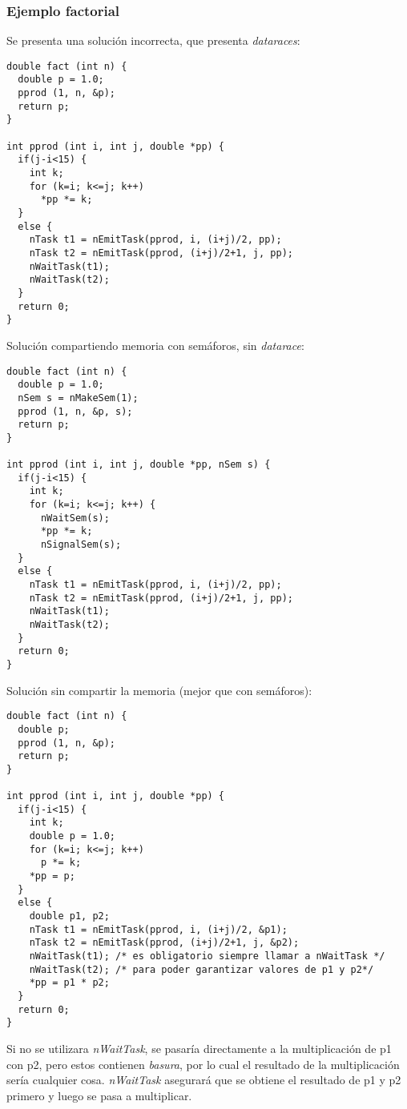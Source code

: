 \subsubsection{Ejemplo factorial}

Se presenta una solución incorrecta, que presenta \emph{dataraces}:

\begin{verbatim}
double fact (int n) {
  double p = 1.0;
  pprod (1, n, &p);
  return p;
}

int pprod (int i, int j, double *pp) {
  if(j-i<15) {
    int k;
    for (k=i; k<=j; k++)
      *pp *= k;
  }
  else {
    nTask t1 = nEmitTask(pprod, i, (i+j)/2, pp);
    nTask t2 = nEmitTask(pprod, (i+j)/2+1, j, pp);
    nWaitTask(t1);
    nWaitTask(t2);
  }
  return 0;
}
\end{verbatim}

Solución compartiendo memoria con semáforos, sin \emph{datarace}:

\begin{verbatim}
double fact (int n) {
  double p = 1.0;
  nSem s = nMakeSem(1);
  pprod (1, n, &p, s);
  return p;
}

int pprod (int i, int j, double *pp, nSem s) {
  if(j-i<15) {
    int k;
    for (k=i; k<=j; k++) {
      nWaitSem(s);
      *pp *= k;
      nSignalSem(s);
  }
  else {
    nTask t1 = nEmitTask(pprod, i, (i+j)/2, pp);
    nTask t2 = nEmitTask(pprod, (i+j)/2+1, j, pp);
    nWaitTask(t1);
    nWaitTask(t2);
  }
  return 0;
}
\end{verbatim}

Solución sin compartir la memoria (mejor que con semáforos):

\begin{verbatim}
double fact (int n) {
  double p;
  pprod (1, n, &p);
  return p;
}

int pprod (int i, int j, double *pp) {
  if(j-i<15) {
    int k;
    double p = 1.0;
    for (k=i; k<=j; k++)
      p *= k;
    *pp = p;
  }
  else {
    double p1, p2;
    nTask t1 = nEmitTask(pprod, i, (i+j)/2, &p1);
    nTask t2 = nEmitTask(pprod, (i+j)/2+1, j, &p2);
    nWaitTask(t1); /* es obligatorio siempre llamar a nWaitTask */
    nWaitTask(t2); /* para poder garantizar valores de p1 y p2*/
    *pp = p1 * p2;
  }
  return 0;
}
\end{verbatim}

Si no se utilizara \emph{nWaitTask}, se pasaría directamente a la multiplicación de p1 con p2, pero estos contienen \emph{basura}, por lo cual el resultado de la multiplicación sería cualquier cosa. \emph{nWaitTask} asegurará que se obtiene el resultado de p1 y p2 primero y luego se pasa a multiplicar.

